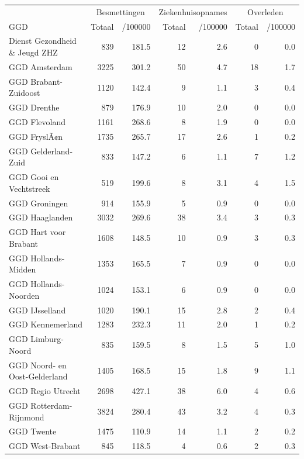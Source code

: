 \documentclass[
  english,
  man,floatsintext]{apa6}
\begin{document}
\begin{table}
\centering\begingroup\fontsize{10}{12}\selectfont

\begin{threeparttable}
\begin{tabular}{lrrrrrr}
\toprule
\multicolumn{1}{c}{ } & \multicolumn{2}{c}{Besmettingen} & \multicolumn{2}{c}{Ziekenhuisopnames} & \multicolumn{2}{c}{Overleden} \\
\cmidrule(l{3pt}r{3pt}){2-3} \cmidrule(l{3pt}r{3pt}){4-5} \cmidrule(l{3pt}r{3pt}){6-7}
GGD & Totaal & /100000 & Totaal & /100000 & Totaal & /100000\\
\midrule
Dienst Gezondheid \& Jeugd ZHZ & 839 & 181.5 & 12 & 2.6 & 0 & 0.0\\
GGD Amsterdam & 3225 & 301.2 & 50 & 4.7 & 18 & 1.7\\
GGD Brabant-Zuidoost & 1120 & 142.4 & 9 & 1.1 & 3 & 0.4\\
GGD Drenthe & 879 & 176.9 & 10 & 2.0 & 0 & 0.0\\
GGD Flevoland & 1161 & 268.6 & 8 & 1.9 & 0 & 0.0\\
GGD FryslÃ¢n & 1735 & 265.7 & 17 & 2.6 & 1 & 0.2\\
GGD Gelderland-Zuid & 833 & 147.2 & 6 & 1.1 & 7 & 1.2\\
GGD Gooi en Vechtstreek & 519 & 199.6 & 8 & 3.1 & 4 & 1.5\\
GGD Groningen & 914 & 155.9 & 5 & 0.9 & 0 & 0.0\\
GGD Haaglanden & 3032 & 269.6 & 38 & 3.4 & 3 & 0.3\\
GGD Hart voor Brabant & 1608 & 148.5 & 10 & 0.9 & 3 & 0.3\\
GGD Hollands-Midden & 1353 & 165.5 & 7 & 0.9 & 0 & 0.0\\
GGD Hollands-Noorden & 1024 & 153.1 & 6 & 0.9 & 0 & 0.0\\
GGD IJsselland & 1020 & 190.1 & 15 & 2.8 & 2 & 0.4\\
GGD Kennemerland & 1283 & 232.3 & 11 & 2.0 & 1 & 0.2\\
GGD Limburg-Noord & 835 & 159.5 & 8 & 1.5 & 5 & 1.0\\
GGD Noord- en Oost-Gelderland & 1405 & 168.5 & 15 & 1.8 & 9 & 1.1\\
GGD Regio Utrecht & 2698 & 427.1 & 38 & 6.0 & 4 & 0.6\\
GGD Rotterdam-Rijnmond & 3824 & 280.4 & 43 & 3.2 & 4 & 0.3\\
GGD Twente & 1475 & 110.9 & 14 & 1.1 & 2 & 0.2\\
GGD West-Brabant & 845 & 118.5 & 4 & 0.6 & 2 & 0.3\\

\end{tabular}
\end{threeparttable}
\end{table}
\end{document}
